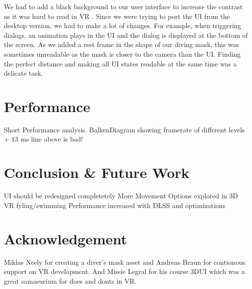 \documentclass[letterpaper, 10 pt, conference]{ieeeconf}  %
\begin{document}
We had to add a black background to our user interface to increase the contrast as it was hard to read in VR \cite{dingler2018vr}.
Since we were trying to port the UI from the desktop version, we had to make a lot of changes.
For example, when triggering dialogs, an animation plays in the UI and the dialog is displayed at the bottom of the screen.
As we added a rest frame in the shape of our diving mask, this was sometimes unreadable as the mask is closer to the camera than the UI.
Finding the perfect distance and making all UI states readable at the same time was a delicate task.

\section{Performance}
\label{Sec:Performance}

Short Performance analysis.
BalkenDiagram showing framerate of different levels + 13 ms line above is bad!

\section{Conclusion \& Future Work}
\label{Sec:ConcFuture}

UI should be redesigned completetely
More Movement Options explored in 3D VR fyling/swimming
Performance increased with DLSS and optimizations

\section*{Acknowledgement}
\label{Sec:Acknowledgement}

Miklas Neely for creating a diver's mask asset and Andreas Braun for contionous support on VR development.
And Missie Legral for his course 3DUI which was a great samasurium for does and donts in VR.

\end{document}
